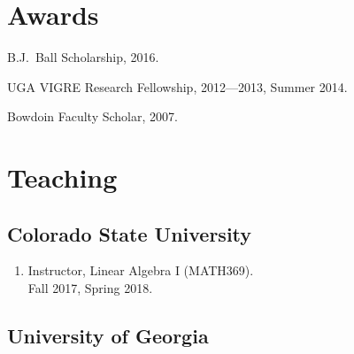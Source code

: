 \documentclass[letterpaper]{article}
\renewenvironment{itemize}{
  \begin{list}{}{
    \setlength{\leftmargin}{1.5em}
  }
}{
  \end{list}
}
\begin{document}
 \section*{Awards}

 \begin{itemize}
 \item B.J.\ Ball Scholarship, 2016.
 \item UGA VIGRE Research Fellowship, 2012---2013, Summer 2014.
 \item Bowdoin Faculty Scholar, 2007.
 \end{itemize}

\section*{Teaching}

\subsection*{Colorado State University}

\begin{enumerate}
\item Instructor, Linear Algebra I (MATH369). \\
  Fall 2017, Spring 2018.
\end{enumerate}

\subsection*{University of Georgia}
\end{document}
